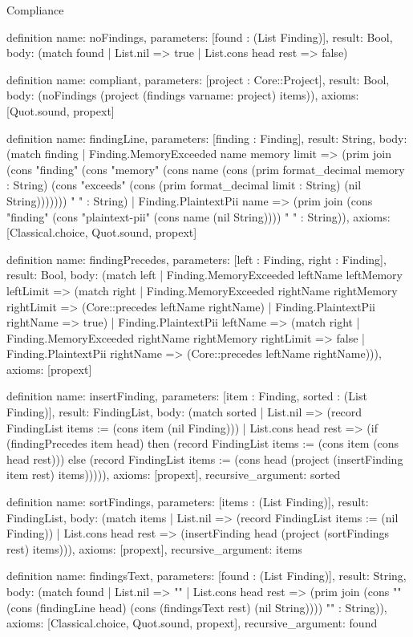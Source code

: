 \begin{lexlean}{Compliance}
\begin{semanticmodule}
definition{
  name: noFindings,
  parameters: [found : (List Finding)],
  result: Bool,
  body: (match found | List.nil => true | List.cons head rest => false)
}

definition{
  name: compliant,
  parameters: [project : Core::Project],
  result: Bool,
  body: (noFindings (project (findings var{name: project}) items)),
  axioms: [Quot.sound, propext]
}

definition{
  name: findingLine,
  parameters: [finding : Finding],
  result: String,
  body: (match finding
    | Finding.MemoryExceeded name memory limit => (prim join (cons "finding" (cons "memory" (cons name (cons (prim format_decimal memory : String) (cons "exceeds" (cons (prim format_decimal limit : String) (nil String))))))) " " : String)
    | Finding.PlaintextPii name => (prim join (cons "finding" (cons "plaintext-pii" (cons name (nil String)))) " " : String)),
  axioms: [Classical.choice, Quot.sound, propext]
}

definition{
  name: findingPrecedes,
  parameters: [left : Finding, right : Finding],
  result: Bool,
  body: (match left
    | Finding.MemoryExceeded leftName leftMemory leftLimit => (match right
      | Finding.MemoryExceeded rightName rightMemory rightLimit => (Core::precedes leftName rightName)
      | Finding.PlaintextPii rightName => true)
    | Finding.PlaintextPii leftName => (match right
      | Finding.MemoryExceeded rightName rightMemory rightLimit => false
      | Finding.PlaintextPii rightName => (Core::precedes leftName rightName))),
  axioms: [propext]
}

definition{
  name: insertFinding,
  parameters: [item : Finding, sorted : (List Finding)],
  result: FindingList,
  body: (match sorted
    | List.nil => (record FindingList {items := (cons item (nil Finding))})
    | List.cons head rest => (if (findingPrecedes item head) then (record FindingList {items := (cons item (cons head rest))}) else (record FindingList {items := (cons head (project (insertFinding item rest) items))}))),
  axioms: [propext],
  recursive_argument: sorted
}

definition{
  name: sortFindings,
  parameters: [items : (List Finding)],
  result: FindingList,
  body: (match items
    | List.nil => (record FindingList {items := (nil Finding)})
    | List.cons head rest => (insertFinding head (project (sortFindings rest) items))),
  axioms: [propext],
  recursive_argument: items
}

definition{
  name: findingsText,
  parameters: [found : (List Finding)],
  result: String,
  body: (match found
    | List.nil => ""
    | List.cons head rest => (prim join (cons "\n" (cons (findingLine head) (cons (findingsText rest) (nil String)))) "" : String)),
  axioms: [Classical.choice, Quot.sound, propext],
  recursive_argument: found
}


\end{semanticmodule}
\end{lexlean}
